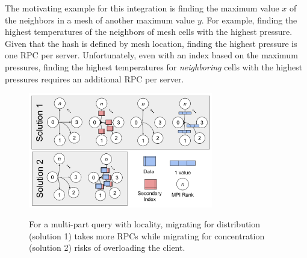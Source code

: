 The motivating example for this integration is finding the
maximum value \(x\) of the neighbors in a mesh of another maximum value \(y\).
For example, finding the highest temperatures of the neighbors of mesh cells
with the highest pressure. Given that the hash is defined by mesh location,
finding the highest pressure is one RPC per server.  Unfortunately, even
with an index based on the maximum pressures, finding the highest temperatures
for {\it neighboring} cells with the highest pressures requires an additional
RPC per server. 

\begin{figure}[t]
  \noindent\includegraphics[width=19pc,angle=0]{figures/example.png}\\
  \caption{For a multi-part query with locality, migrating for distribution
  (solution 1) takes more RPCs while migrating for concentration (solution 2)
  risks of overloading the client.}
  \label{fig:example}
\end{figure}


